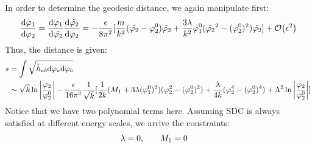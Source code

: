 In order to determine the geodesic distance, we again manipulate first:
\begin{align}
    \dv{\varphi_{1}}{\varphi_{2}} = \dv{\varphi_{1}}{\tilde{\varphi_{2}}}\dv{\tilde{\varphi_{2}}}{\varphi_{2}} = -\frac{\epsilon}{8\pi^{2}}[\frac{m}{k^{2}}(\tilde{\varphi_{2}} - \varphi_{2}^{0})\tilde{\varphi_{2}} + \frac{3\lambda}{k^{2}}\varphi_{1}^{0} (\tilde{\varphi_{2}}^{2} - (\varphi_{2}^{0})^{2})\tilde{\varphi_{2}}] + \order{\epsilon ^{2}} 
\end{align}
Thus, the distance is given:
\begin{align}
    \begin{split}
    s &= \int \sqrt{\tilde{h}_{ab} \dd \varphi_{a} \dd \varphi_{b}} \\
    & \sim \sqrt{k}\ln \abs{\frac{\varphi_{2}}{\varphi_{2}^{0}}} - \frac{\epsilon}{16\pi^{2}}\frac{1}{\sqrt{k}} [\frac{1}{2k}(M_{1}+3\lambda(\varphi_{1}^{0})^{2})(\varphi_{2}^{2} - (\varphi_{2}^{0})^{2}) + \frac{\lambda}{4k} (\varphi_{2}^{4} - (\varphi_{2}^{0})^{4}) + \Lambda^{2} \ln \abs{\frac{\varphi_{2}}{\varphi_{2}^{0}}}]
    \end{split}
\end{align}
Notice that we have two polynomial terms here. Assuming SDC is always satisfied at different energy scales, we arrive the constraints:
\begin{align}
    \lambda = 0, & \qq{} M_{1} = 0
\end{align}

